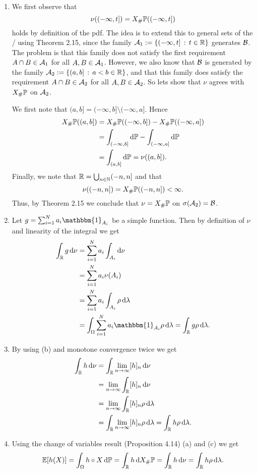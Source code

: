 \begin{enumerate}[label=(\alph*)]
\item We first observe that 
\[
	\nu((-\infty,t]) = X_\# \mathbb P((-\infty,t])
\]
holds by definition of the pdf. The idea is to extend this to general sets of the \sigalg/ using Theorem 2.15, since the family $\mathcal A_1 := \{(-\infty, t] \, : \, t \in \mathbb R\}$ generates $\mathcal B$. The problem is that this family does not satisfy the first requirement $A \cap B \in \mathcal A_1$ for all $A, B \in \mathcal A_1$. However, we also know that $\mathcal B$ is generated by the family $\mathcal A_2 := \{(a,b] \, : \, a < b \in \mathbb R\}$, and that this family does satisfy the requirement $A \cap B \in \mathcal A_2$ for all $A, B \in \mathcal A_2$. So lets show that $\nu$ agrees with $X_\# \mathbb P$ on $\mathcal A_2$.

We first note that $(a,b] = (-\infty,b] \setminus (-\infty,a]$. Hence
\begin{align*}
	X_\# \mathbb P((a,b]) &= X_\# \mathbb P((-\infty, b]) - X_\# \mathbb P((-\infty, a]) \\
	&= \int_{(-\infty, b]} \mathrm{d} \mathbb P - \int_{(-\infty, a]} \mathrm{d} \mathbb P \\
	&= \int_{(a,b]} \mathrm{d} \mathbb P = \nu((a,b]).
\end{align*}
Finally, we note that $\mathbb R = \bigcup_{n \in \mathbb N} (-n,n]$ and that
\[
	\nu((-n,n]) = X_\# \mathbb P((-n,n]) < \infty. 
\]
Thus, by Theorem 2.15 we conclude that $\nu = X_\# \mathbb P$ on $\sigma(\mathcal A_2) = \mathcal B$.

\item Let $g = \sum_{i = 1}^N a_i \mathbbm{1}_{A_i}$ be a simple function. Then by definition of $\nu$ and linearity of the integral we get
\begin{align*}
	\int_\bbR g \, \dd \nu &= \sum_{i = 1}^N a_i \int_{A_i} \dd \nu\\
	&= \sum_{i = 1}^N a_i \nu(A_i) \\ 
	&= \sum_{i = 1}^N a_i \int_{A_i} \rho \, \dd \lambda \\
	&= \int_{\Omega} \sum_{i = 1}^N a_i \mathbbm{1}_{A_i} \rho \, \dd \lambda
	= \int_\bbR g \rho \, \dd \lambda.
\end{align*}
\item By using (b) and monotone convergence twice we get
\begin{align*}
	\int_{\mathbb R} h \, \mathrm{d} \nu &= \int_{\mathbb R} \lim_{n \to \infty} [h]_n \, \mathrm{d} \nu \\
	&= \lim_{n \to \infty} \int_{\mathbb R} [h]_n \, \mathrm{d} \nu \\
	&= \lim_{n \to \infty} \int_{\mathbb R} [h]_n \rho \, \mathrm{d} \lambda \\
	&= \int_{\mathbb R} \lim_{n \to \infty} [h]_n \rho \, \mathrm{d} \lambda = \int_{\mathbb R} h \rho \, \mathrm{d} \lambda.
\end{align*}
\item Using the change of variables result (Proposition 4.14) (a) and (c) we get
\[
	\mathbb E[h(X)] = \int_\Omega h \circ X \, \mathrm{d} \mathbb P 
	= \int_{\mathbb R} h \, \mathrm{d} X_\# \mathbb P = \int_{\mathbb R} h \, \mathrm{d} \nu 
	= \int_{\mathbb R} h \rho \, \mathrm{d} \lambda.
\]
\end{enumerate}


